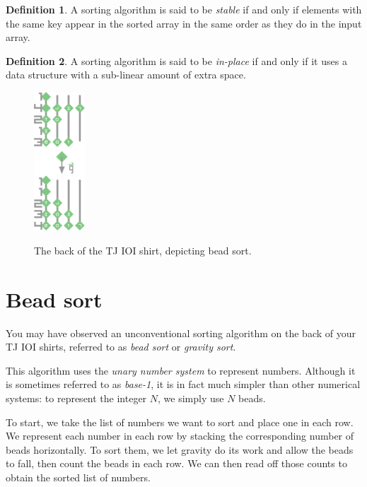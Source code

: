 \documentclass{exam}
\theoremstyle{definition}
\theoremstyle{definition}
\newtheorem{definition}{Definition}[section]
\begin{document}
\begin{definition}
    A sorting algorithm is said to be \textit{stable} if and only if elements with the same key appear in the sorted array in the same order as they do in the input array. 
\end{definition}

\begin{definition}
    A sorting algorithm is said to be \textit{in-place} if and only if it uses a data structure with a sub-linear amount of extra space. 
\end{definition}



\begin{figure}
    \centering
    \includegraphics[width=0.17\textwidth]{tjioi_shirt_cropped.png}
    \label{fig:beadsort}
    \caption{The back of the TJ IOI shirt, depicting bead sort.}
\end{figure}

\section{Bead sort}

You may have observed an unconventional sorting algorithm on the back of your TJ IOI shirts, referred to as \textit{bead sort} or \textit{gravity sort}.

This algorithm uses the \textit{unary number system} to represent numbers. Although it is sometimes referred to as \textit{base-1}, it is in fact much simpler than other numerical systems: to represent the integer $ N $, we simply use $ N $ beads.

To start, we take the list of numbers we want to sort and place one in each row. We represent each number in each row by stacking the corresponding number of beads horizontally. To sort them, we let gravity do its work and allow the beads to fall, then count the beads in each row. We can then read off those counts to obtain the sorted list of numbers.
\end{document}
